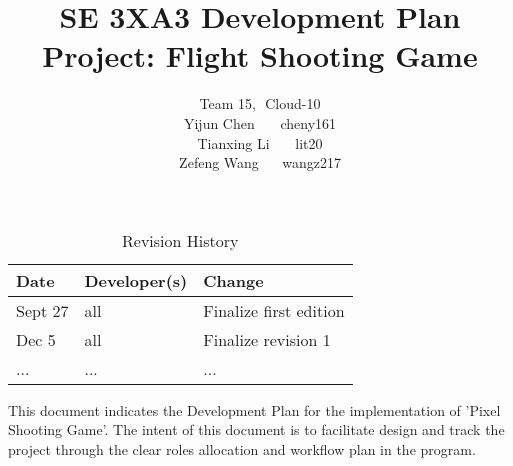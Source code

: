 \documentclass{article}
\title{SE 3XA3 Development Plan\\Project: Flight Shooting Game}
\author{Team 15, \,\,Cloud-10
		\\ Yijun Chen \,\,\,\,\,\,\,\,\,cheny161
		\\ Tianxing Li \,\,\,\,\,\,\,\,\,lit20
		\\ Zefeng Wang\,\,\,\,\,\,\,\,\,\,wangz217
}
\date{}
\begin{document}
\begin{table}[hp]
\caption{Revision History} \label{TblRevisionHistory}
\begin{tabularx}{\textwidth}{llX}
\toprule
\textbf{Date} & \textbf{Developer(s)} & \textbf{Change}\\
\midrule
Sept 27 & all & Finalize first edition \\
Dec 5 & all & Finalize revision 1\\
... & ... & ...\\
\bottomrule
\end{tabularx}
\end{table}

\newpage

\maketitle
\newpage

This document indicates the Development Plan for the implementation of ’Pixel Shooting Game’. The intent of this document is to facilitate design and track the project through the clear roles allocation and workflow plan in the program.
\end{document}
